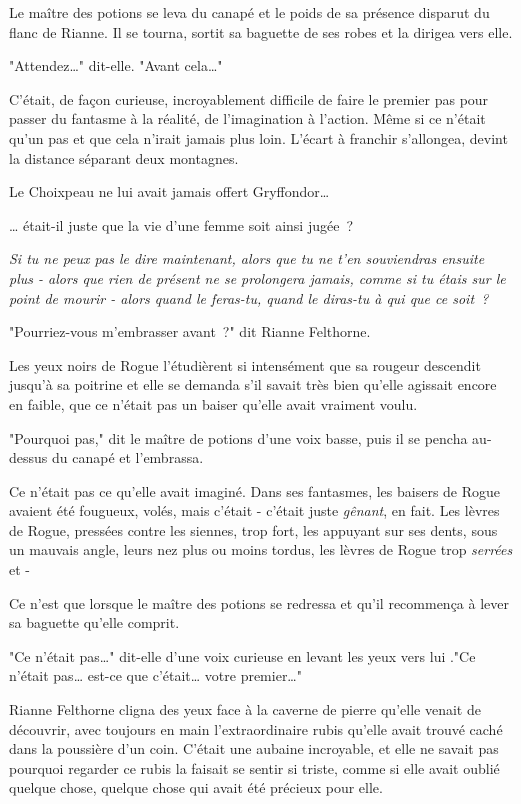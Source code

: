 Le maître des potions se leva du canapé et le poids de sa présence disparut du flanc de Rianne. Il se tourna, sortit sa baguette de ses robes et la dirigea vers elle.

"Attendez…" dit-elle. "Avant cela…"

C'était, de façon curieuse, incroyablement difficile de faire le premier pas pour passer du fantasme à la réalité, de l'imagination à l'action. Même si ce n'était qu'un pas et que cela n'irait jamais plus loin. L'écart à franchir s'allongea, devint la distance séparant deux montagnes.

Le Choixpeau ne lui avait jamais offert Gryffondor…

… était-il juste que la vie d'une femme soit ainsi jugée~?

\emph{Si tu ne peux pas le dire maintenant, alors que tu ne t'en souviendras ensuite plus - alors que rien de présent ne se prolongera jamais, comme si tu étais sur le point de mourir - alors quand le feras-tu, quand le diras-tu à qui que ce soit~?}

"Pourriez-vous m'embrasser avant~?" dit Rianne Felthorne.

Les yeux noirs de Rogue l'étudièrent si intensément que sa rougeur descendit jusqu'à sa poitrine et elle se demanda s'il savait très bien qu'elle agissait encore en faible, que ce n'était pas un baiser qu'elle avait vraiment voulu.

"Pourquoi pas," dit le maître de potions d'une voix basse, puis il se pencha au-dessus du canapé et l'embrassa.

Ce n'était pas ce qu'elle avait imaginé. Dans ses fantasmes, les baisers de Rogue avaient été fougueux, volés, mais c'était - c'était juste \emph{gênant}, en fait. Les lèvres de Rogue, pressées contre les siennes, trop fort, les appuyant sur ses dents, sous un mauvais angle, leurs nez plus ou moins tordus, les lèvres de Rogue trop \emph{serrées} et -

Ce n'est que lorsque le maître des potions se redressa et qu'il recommença à lever sa baguette qu'elle comprit.

"Ce n'était pas…" dit-elle d'une voix curieuse en levant les yeux vers lui ."Ce n'était pas… est-ce que c'était… votre premier…"

Rianne Felthorne cligna des yeux face à la caverne de pierre qu'elle venait de découvrir, avec toujours en main l'extraordinaire rubis qu'elle avait trouvé caché dans la poussière d'un coin. C'était une aubaine incroyable, et elle ne savait pas pourquoi regarder ce rubis la faisait se sentir si triste, comme si elle avait oublié quelque chose, quelque chose qui avait été précieux pour elle. 

